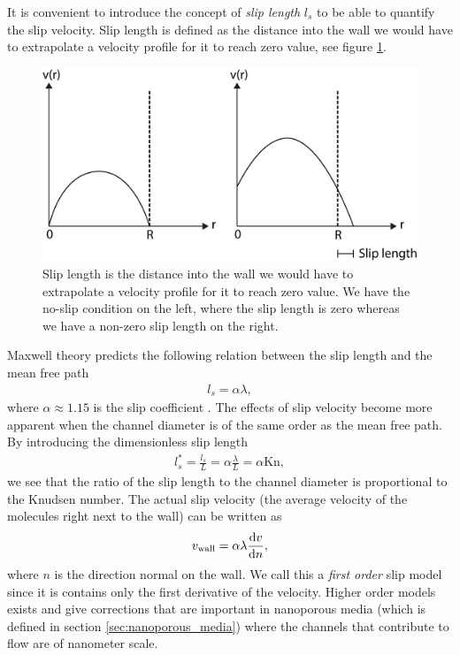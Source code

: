 It is convenient to introduce the concept of \textit{slip length} $l_s$ to be able to quantify the slip velocity. Slip length is defined as the distance into the wall we would have to extrapolate a velocity profile for it to reach zero value, see figure \ref{fig:slip_length}.
\begin{figure}[h]
\begin{center}
\includegraphics[width=\textwidth, trim=0cm 0cm 0cm 0cm, clip]{DSMC/figures/slip_length.eps}
\end{center}
\caption{Slip length is the distance into the wall we would have to extrapolate a velocity profile for it to reach zero value. We have the no-slip condition on the left, where the slip length is zero whereas we have a non-zero slip length on the right.}
\label{fig:slip_length}
\end{figure}
Maxwell theory predicts the following relation between the slip length and the mean free path
\begin{align}
	\label{eq:noslip_sliplength}
	l_s = \alpha \lambda,
\end{align}
where $\alpha\approx 1.15$ is the slip coefficient \cite{morris1992slip}. The effects of slip velocity become more apparent when the channel diameter is of the same order as the mean free path. By introducing the dimensionless slip length
\begin{align}
	l_s^* = \frac{l_s}{ L} = \alpha \frac{\lambda }{ L} = \alpha \text{Kn},
\end{align}
we see that the ratio of the slip length to the channel diameter is proportional to the Knudsen number. The actual slip velocity (the average velocity of the molecules right next to the wall) can be written as
\begin{align}
	\label{eq:linear_slip_velocity}
	v_{\text{wall}} = \alpha\lambda\frac{\mathrm{d}v}{\mathrm{d}n},
\end{align}
where $n$ is the direction normal on the wall\cite{klinkenberg1941permeability}. We call this a \textit{first order} slip model since it is contains only the first derivative of the velocity. Higher order models exists and give corrections that are important in nanoporous media (which is defined in section \ref{sec:nanoporous_media}) where the channels that contribute to flow are of nanometer scale.

